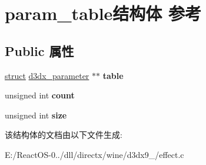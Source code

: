 \hypertarget{structparam__table}{}\section{param\+\_\+table结构体 参考}
\label{structparam__table}
\subsection*{Public 属性}
\begin{DoxyCompactItemize}
\item 
\mbox{\label{structparam__table_af3037038fbf92fe5768ddd31c2880d2e}} 
\hyperlink{interfacestruct}{struct} \hyperlink{structd3dx__parameter}{d3dx\+\_\+parameter} $\ast$$\ast$ {\bfseries table}
\item 
\mbox{\label{structparam__table_a7055d0add7d19305efe57a0e49560401}} 
unsigned int {\bfseries count}
\item 
\mbox{\label{structparam__table_aed2e282f7406fd5a366cee87dcd88093}} 
unsigned int {\bfseries size}
\end{DoxyCompactItemize}


该结构体的文档由以下文件生成\+:\begin{DoxyCompactItemize}
\item 
E\+:/\+React\+O\+S-\/0../dll/directx/wine/d3dx9\+\_/effect.\+c\end{DoxyCompactItemize}
